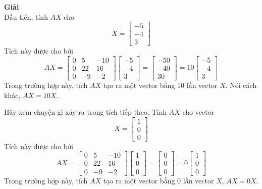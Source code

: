 \textbf{Giải} \\
Đầu tiên, tính $AX$ cho
\begin{equation*}
X=\begin{bmatrix}-5\\ -4\\ 3\end{bmatrix}
\end{equation*}
Tích này được cho bởi
\begin{equation*}
AX=\begin{bmatrix}0&5&-10\\ 0&22&16\\ 0&-9&-2\end{bmatrix}\begin{bmatrix}-5\\ -4\\ 3\end{bmatrix}=\begin{bmatrix}-50\\ -40\\ 30\end{bmatrix}=10\begin{bmatrix}-5\\ -4\\ 3\end{bmatrix}
\end{equation*}
Trong trường hợp này, tích $AX$ tạo ra một vector bằng 10 lần vector $X$. Nói cách khác, $AX=10X$.

Hãy xem chuyện gì xảy ra trong tích tiếp theo. Tính $AX$ cho vector
\begin{equation*}
X=\begin{bmatrix}1\\ 0\\ 0\end{bmatrix}
\end{equation*}
Tích này được cho bởi
\begin{equation*}
AX=\begin{bmatrix}0&5&-10\\ 0&22&16\\ 0&-9&-2\end{bmatrix}\begin{bmatrix}1\\ 0\\ 0\end{bmatrix}=\begin{bmatrix}0\\ 0\\ 0\end{bmatrix}=0\begin{bmatrix}1\\ 0\\ 0\end{bmatrix}
\end{equation*}
Trong trường hợp này, tích $AX$ tạo ra một vector bằng 0 lần vector $X$, $AX=0X$.

